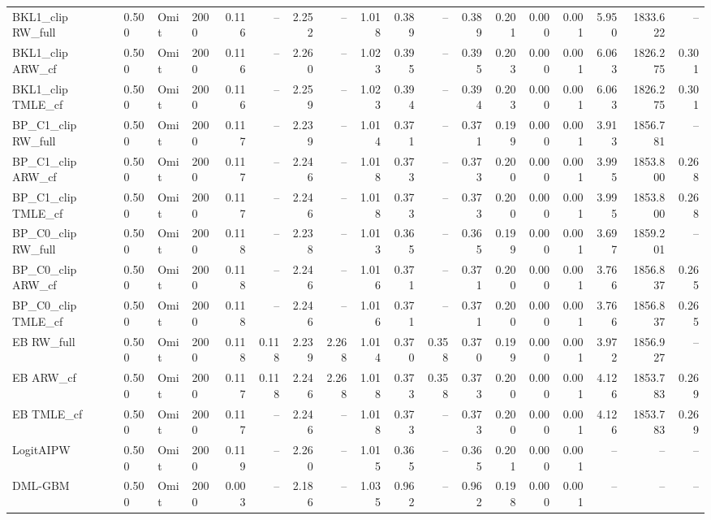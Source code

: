 \begin{tabular}{llllrrrrrrrrrrrrrr}
BKL1\_clip RW\_full & 0.500 & Omit & 2000 & 0.116 & -- & 2.252 & -- & 1.018 & 0.389 & -- & 0.389 & 0.201 & 0.000 & 0.001 & 5.950 & 1833.622 & -- \\
BKL1\_clip ARW\_cf & 0.500 & Omit & 2000 & 0.116 & -- & 2.260 & -- & 1.023 & 0.395 & -- & 0.395 & 0.203 & 0.000 & 0.001 & 6.063 & 1826.275 & 0.301 \\
BKL1\_clip TMLE\_cf & 0.500 & Omit & 2000 & 0.116 & -- & 2.259 & -- & 1.023 & 0.394 & -- & 0.394 & 0.203 & 0.000 & 0.001 & 6.063 & 1826.275 & 0.301 \\
BP\_C1\_clip RW\_full & 0.500 & Omit & 2000 & 0.117 & -- & 2.239 & -- & 1.014 & 0.371 & -- & 0.371 & 0.199 & 0.000 & 0.001 & 3.913 & 1856.781 & -- \\
BP\_C1\_clip ARW\_cf & 0.500 & Omit & 2000 & 0.117 & -- & 2.246 & -- & 1.018 & 0.373 & -- & 0.373 & 0.200 & 0.000 & 0.001 & 3.995 & 1853.800 & 0.268 \\
BP\_C1\_clip TMLE\_cf & 0.500 & Omit & 2000 & 0.117 & -- & 2.246 & -- & 1.018 & 0.373 & -- & 0.373 & 0.200 & 0.000 & 0.001 & 3.995 & 1853.800 & 0.268 \\
BP\_C0\_clip RW\_full & 0.500 & Omit & 2000 & 0.118 & -- & 2.238 & -- & 1.013 & 0.365 & -- & 0.365 & 0.199 & 0.000 & 0.001 & 3.697 & 1859.201 & -- \\
BP\_C0\_clip ARW\_cf & 0.500 & Omit & 2000 & 0.118 & -- & 2.246 & -- & 1.016 & 0.371 & -- & 0.371 & 0.200 & 0.000 & 0.001 & 3.766 & 1856.837 & 0.265 \\
BP\_C0\_clip TMLE\_cf & 0.500 & Omit & 2000 & 0.118 & -- & 2.246 & -- & 1.016 & 0.371 & -- & 0.371 & 0.200 & 0.000 & 0.001 & 3.766 & 1856.837 & 0.265 \\
EB RW\_full & 0.500 & Omit & 2000 & 0.118 & 0.118 & 2.239 & 2.268 & 1.014 & 0.370 & 0.358 & 0.370 & 0.199 & 0.000 & 0.001 & 3.972 & 1856.927 & -- \\
EB ARW\_cf & 0.500 & Omit & 2000 & 0.117 & 0.118 & 2.246 & 2.268 & 1.018 & 0.373 & 0.358 & 0.373 & 0.200 & 0.000 & 0.001 & 4.126 & 1853.783 & 0.269 \\
EB TMLE\_cf & 0.500 & Omit & 2000 & 0.117 & -- & 2.246 & -- & 1.018 & 0.373 & -- & 0.373 & 0.200 & 0.000 & 0.001 & 4.126 & 1853.783 & 0.269 \\
LogitAIPW & 0.500 & Omit & 2000 & 0.119 & -- & 2.260 & -- & 1.015 & 0.365 & -- & 0.365 & 0.201 & 0.000 & 0.001 & -- & -- & -- \\
DML-GBM & 0.500 & Omit & 2000 & 0.003 & -- & 2.186 & -- & 1.035 & 0.962 & -- & 0.962 & 0.198 & 0.000 & 0.001 & -- & -- & -- \\

\end{tabular}
